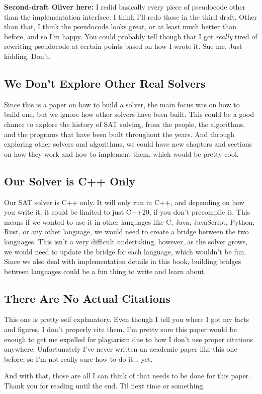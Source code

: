 \textbf{Second-draft Oliver here:} I redid basically every piece of pseudocode other than 
the implementation interface. I think I'll redo those in the third draft. Other than that, 
I think the pseudocode looks great, or at least much better than before, and so I'm happy.
You could probably tell though that I got \textit{really} tired of rewriting pseudocode at 
certain points based on how I wrote it. Sue me. Just kidding. Don't.

\subsection{We Don't Explore Other Real Solvers}

Since this is a paper on how to build a solver, the main focus was on how to build one, 
but we ignore how other solvers have been built. This could be a good chance to explore 
the history of SAT solving, from the people, the algorithms, and the programs that have 
been built throughout the years. And through exploring other solvers and algorithms, we 
could have new chapters and sections on how they work and how to implement them, which 
would be pretty cool.

\subsection{Our Solver is C++ Only}

Our SAT solver is C++ only. It will only run in C++, and depending on how you write it, 
it could be limited to just C++20, if you don't precompile it. This means if we wanted 
to use it in other languages like C, Java, JavaScript, Python, Rust, or any other language, 
we would need to create a bridge between the two languages. This isn't a very difficult 
undertaking, however, as the solver grows, we would need to update the bridge for each 
language, which wouldn't be fun. Since we also deal with implementation details in this 
book, building bridges between languages could be a fun thing to write and learn about.

\subsection{There Are No Actual Citations}

This one is pretty self explanatory. Even though I tell you where I got my facts and 
figures, I don't properly cite them. I'm pretty sure this paper would be enough to 
get me expelled for plagiarism due to how I don't use proper citations anywhere. 
Unfortunately I've never written an academic paper like this one before, so I'm not 
really sure how to do it... yet.

And with that, those are all I can think of that needs to be done for this paper. 
Thank you for reading until the end. Til next time or something.